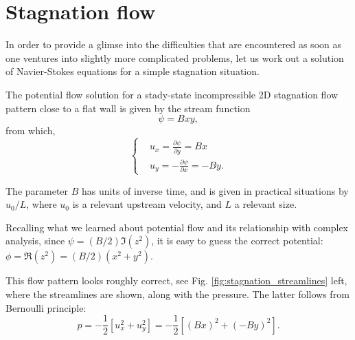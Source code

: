 
\section{Stagnation flow}

In order to provide a glimse into the difficulties that are
encountered as soon as one ventures into slightly more complicated
problems, let us work out a solution of Navier-Stokes equations for a
simple stagnation situation.

The potential flow solution for a stady-state incompressible 2D
stagnation flow pattern close to a flat wall is given by the stream
function
\[
\psi = B x y ,
\]
from which,
\[
\begin{cases}
  & u_x =  \frac{\partial \psi}{\partial y} =   B x \\
  & u_y = -\frac{\partial \psi}{\partial x} = - B y .
\end{cases}
\]

The parameter $B$ has units of inverse time, and is given in practical
situations by $u_0 / L$, where $u_0$ is a relevant upstream velocity,
and $L$ a relevant size.

Recalling what we learned about potential flow and its relationship
with complex analysis, since $\psi = (B/2) \Im (z^2)$, it is easy to guess the
correct potential: $\phi=\Re( z^2) = (B/2) (x^2 + y^2)$.

This flow pattern looks roughly correct, see
Fig. \ref{fig:stagnation_streamlines} left, where the streamlines are
shown, along with the pressure. The latter follows from Bernoulli
principle:
\begin{equation}
  \label{eq:p_stag_pot}
p =
 -\frac{1}{2} \left[
  u_x ^2 +
  u_y^2
  \right] =
-\frac{1}{2} \left[
  (B x)^2 +
  (-B y)^2
  \right].  
\end{equation}


